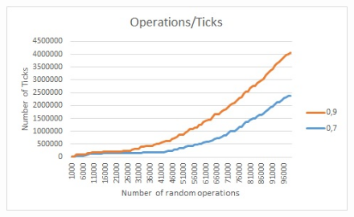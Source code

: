 \documentclass[article, a4paper]{llncs}
\begin{document}
    \begin{figure}[h]
        \includegraphics[width=15cm, height=9cm]{summary time of several operations.jpg}
        \centering
    \end{figure}
\end{document}
